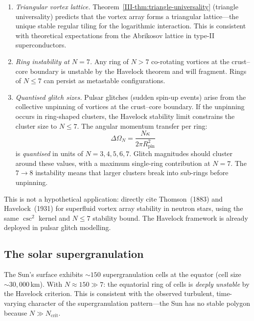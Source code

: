 \begin{enumerate}
\item \emph{Triangular vortex lattice.}
  Theorem~\ref{III-thm:triangle-universality} (triangle universality)
  predicts that the vortex array forms a triangular lattice---the
  unique stable regular tiling for the logarithmic interaction.
  This is consistent with theoretical expectations from the
  Abrikosov lattice in type-II superconductors.

\item \emph{Ring instability at $N = 7$.}
  Any ring of $N > 7$ co-rotating vortices at the crust--core
  boundary is unstable by the Havelock theorem and will fragment.
  Rings of $N \le 7$ can persist as metastable configurations.

\item \emph{Quantised glitch sizes.}
  Pulsar glitches (sudden spin-up events) arise from the
  collective unpinning of vortices at the crust--core boundary.
  If the unpinning occurs in ring-shaped clusters, the
  Havelock stability limit constrains the cluster size to $N \le 7$.
  The angular momentum transfer per ring:
  \[
    \Delta\Omega_N = \frac{N\kappa}{2\pi R_{\mathrm{pin}}^2}
  \]
  is \emph{quantised} in units of $N = 3, 4, 5, 6, 7$.
  Glitch magnitudes should cluster around these values,
  with a maximum single-ring contribution at $N = 7$.
  The $7 \to 8$ instability means that larger clusters
  break into sub-rings before unpinning.
\end{enumerate}

\noindent
This is not a hypothetical application:
\citet{Howitt2020} directly cite Thomson~(1883) and
Havelock~(1931) for superfluid vortex array stability in
neutron stars, using the same $\csc^2$ kernel and $N \le 7$
stability bound.
The Havelock framework is already deployed in pulsar
glitch modelling.

\subsection{The solar supergranulation}

The Sun's surface exhibits ${\sim}150$ supergranulation cells
at the equator (cell size ${\sim}30{,}000$\,km).
With $N \approx 150 \gg 7$: the equatorial ring of cells
is \emph{deeply unstable} by the Havelock criterion.
This is consistent with the observed turbulent, time-varying
character of the supergranulation pattern---the Sun has no
stable polygon because $N \gg N_{\mathrm{crit}}$.

